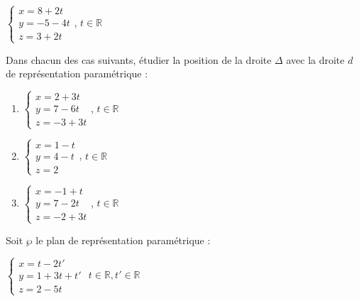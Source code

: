 \documentclass{cornouaille}
\begin{document}
\begin{colonne*exercice}
\begin{exercice}
  \begin{center}
    $\begin{cases}x=8+2t \\y=-5-4t \\z=3+2t \end{cases}$,
    $t\in\mathbb{R}$
  \end{center}

  Dans chacun des cas suivants, étudier la position de la droite
  $\Delta$ avec la droite $d$ de représentation paramétrique :
  \begin{enumerate}
  \item \begin{center}
      $\begin{cases}x=2+3t\\y=7-6t \\z=-3+3t\end{cases}$,
      $t\in\mathbb{R}$
    \end{center}
  \item \begin{center} $\begin{cases}x=1-t \\y=4-t \\z=2 \end{cases}$, $t\in\mathbb{R}$
    \end{center}
  \item \begin{center}
      $\begin{cases}x=-1+t \\y=7-2t \\z=-2+3t \end{cases}$,
      $t\in\mathbb{R}$
    \end{center}
  \end{enumerate}
\end{exercice}

\begin{exercice}
  Soit $\wp$ le plan de représentation paramétrique :

\begin{center}
  $\begin{cases}x=t-2t' \\y=1+3t+t' \\z=2-5t \end{cases}$
  $t\in\mathbb{R}, t'\in\mathbb{R}$
\end{center}


\end{exercice}
\end{colonne*exercice}
\end{document}
